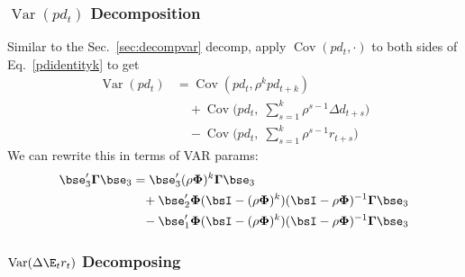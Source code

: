 \documentclass[12pt]{article}
\theoremstyle{plain}
\theoremstyle{definition}
\theoremstyle{remark}
\newcommand{\bsGamma}{\boldsymbol{\Gamma}}
\newcommand{\bsPhi}{\boldsymbol{\Phi}}
\newcommand{\Cov}{\operatorname{Cov}}
\newcommand{\Var}{\operatorname{Var}}
\begin{document}
\begin{multicols*}{2}
\subsubsection{$\Var(pd_t)$ Decomposition}

Similar to the Sec.~\ref{sec:decompvar} decomp, apply $\Cov(pd_t,\cdot)$
to both sides of Eq.~\ref{pdidentityk} to get
\begin{align*}
  \Var(pd_t)
  &=
  \Cov(
      pd_t,
      \rho^k pd_{t+k}
      )
  \\
  &\quad
  +\Cov\bigg(
    pd_t,\;
    \sum_{s=1}^k \rho^{s-1}\Delta d_{t+s}
  \bigg)
  \\
  &\quad-
  \Cov\bigg(
    pd_t,\;
    \sum_{s=1}^k \rho^{s-1}r_{t+s}
  \bigg)
\end{align*}
We can rewrite this in terms of VAR params:
\begin{align*}
  \bse_3'\bsGamma\bse_3
  &=
  \bse_3'
  (\rho\bsPhi)^k\bsGamma
  \bse_3
  \\
  &\;\;\;
  + \bse_2'
  \bsPhi(\bsI-(\rho\bsPhi)^k)(\bsI-\rho\bsPhi)^{-1}
  \bsGamma
  \bse_3
  \\
  &\;\;\;
  - \bse_1'
  \bsPhi(\bsI-(\rho\bsPhi)^k)(\bsI-\rho\bsPhi)^{-1}
  \bsGamma
  \bse_3
\end{align*}

\subsubsection{$\Var(\Delta \E_t r_t)$ Decomposing}


\end{multicols*}
\end{document}
